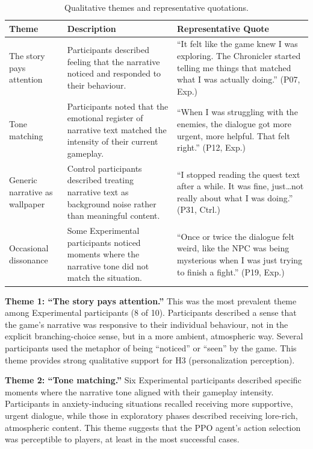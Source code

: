 \begin{table}[H]
\centering
\caption{Qualitative themes and representative quotations.}
\label{tab:themes}
\small
\begin{tabular}{@{}p{3cm}p{4cm}p{6cm}@{}}
\toprule
\textbf{Theme} & \textbf{Description} & \textbf{Representative Quote} \\
\midrule
The story pays attention & Participants described feeling that the narrative noticed and responded to their behaviour. & ``It felt like the game knew I was exploring. The Chronicler started telling me things that matched what I was actually doing.'' (P07, Exp.) \\[6pt]
Tone matching & Participants noted that the emotional register of narrative text matched the intensity of their current gameplay. & ``When I was struggling with the enemies, the dialogue got more urgent, more helpful. That felt right.'' (P12, Exp.) \\[6pt]
Generic narrative as wallpaper & Control participants described treating narrative text as background noise rather than meaningful content. & ``I stopped reading the quest text after a while. It was fine, just\ldots not really about what I was doing.'' (P31, Ctrl.) \\[6pt]
Occasional dissonance & Some Experimental participants noticed moments where the narrative tone did not match the situation. & ``Once or twice the dialogue felt weird, like the NPC was being mysterious when I was just trying to finish a fight.'' (P19, Exp.) \\
\bottomrule
\end{tabular}
\end{table}

\textbf{Theme 1: ``The story pays attention.''} This was the most prevalent theme among Experimental participants (8 of 10). Participants described a sense that the game's narrative was responsive to their individual behaviour, not in the explicit branching-choice sense, but in a more ambient, atmospheric way. Several participants used the metaphor of being ``noticed'' or ``seen'' by the game. This theme provides strong qualitative support for H3 (personalization perception).

\textbf{Theme 2: ``Tone matching.''} Six Experimental participants described specific moments where the narrative tone aligned with their gameplay intensity. Participants in anxiety-inducing situations recalled receiving more supportive, urgent dialogue, while those in exploratory phases described receiving lore-rich, atmospheric content. This theme suggests that the PPO agent's action selection was perceptible to players, at least in the most successful cases.

